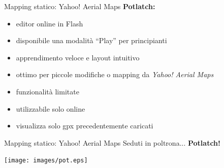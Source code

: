 \documentclass[slidestop,compress,red,notes,xcolor=dvipsnames]{beamer}	%
\begin{document}
        \begin{frame}{Mapping statico: Yahoo! Aerial Maps}
        \textbf{Potlatch:}
            \begin{itemize}
                \item editor online in Flash
                \pause
                \item disponibile una modalità ``Play'' per principianti
                \pause
                \item apprendimento veloce e layout intuitivo
                \pause
                \item ottimo per piccole modifiche o mapping da \textit{Yahoo! Aerial Maps}
                \pause
                \item funzionalità limitate
                \pause
                \item utilizzabile solo online
                \pause
                \item visualizza solo gpx precedentemente caricati
            \end{itemize}
        \end{frame}

        \begin{frame}{Mapping statico: Yahoo! Aerial Maps}
            Seduti in poltrona... \textbf{Potlatch!}
            \begin{center}
                \texttt{[image: images/pot.eps]}
            \end{center}
        \end{frame}
\end{document}

